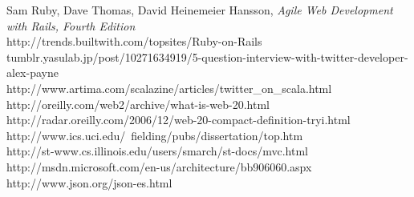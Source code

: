 \begin{thebibliography}{99}
   Sam Ruby, Dave Thomas, David Heinemeier Hansson, \emph{Agile Web Development with Rails, Fourth Edition}\\
    http://trends.builtwith.com/topsites/Ruby-on-Rails\\
   tumblr.yasulab.jp/post/10271634919/5-question-interview-with-twitter-developer-alex-payne\\
   http://www.artima.com/scalazine/articles/twitter\_on\_scala.html\\
   http://oreilly.com/web2/archive/what-is-web-20.html\\
   http://radar.oreilly.com/2006/12/web-20-compact-definition-tryi.html\\
   http://www.ics.uci.edu/~fielding/pubs/dissertation/top.htm\\
   http://st-www.cs.illinois.edu/users/smarch/st-docs/mvc.html\\
   http://msdn.microsoft.com/en-us/architecture/bb906060.aspx\\
   http://www.json.org/json-es.html

\end{thebibliography}




